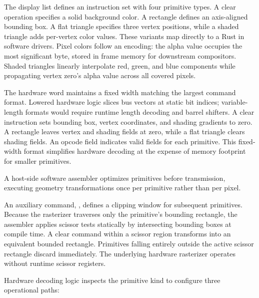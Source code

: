 \documentclass[journal,9pt]{IEEEtran}
\newcommand{\gpupart}[4]{%
}
\begin{document}
The display list defines an instruction set with four primitive types. A
clear operation specifies a solid background color. A rectangle defines an
axis-aligned bounding box. A flat triangle specifies three vertex positions,
while a shaded triangle adds per-vertex color values. These variants map
directly to a Rust  in software drivers. Pixel colors follow an
 encoding: the alpha value occupies the most significant
byte, stored in frame memory for downstream compositors. Shaded triangles
linearly interpolate red, green, and blue components while propagating vertex
zero's alpha value across all covered pixels.

\gpupart{op.rs}{op}{The instruction set: \code{Op} as written by software,
\code{Kind} as decoded by hardware, and \code{Insn} as transmitted across
the bus.}{lst:g-op}

The hardware word  maintains a fixed width matching the largest
command format. Lowered hardware logic slices bus vectors at static bit
indices; variable-length formats would require runtime length decoding and
barrel shifters. A clear instruction sets bounding box, vertex coordinates,
and shading gradients to zero. A rectangle leaves vertex and shading fields
at zero, while a flat triangle clears shading fields. An opcode field
indicates valid fields for each primitive. This fixed-width format simplifies
hardware decoding at the expense of memory footprint for smaller primitives.

A host-side software assembler optimizes primitives before transmission,
executing geometry transformations once per primitive rather than per pixel.

\gpupart{op.rs}{encode}{\code{Op::encode}: software primitive assembler.
It clips bounding boxes, winds vertices, and prunes degenerate
entries.}{lst:g-encode}

An auxiliary command, , defines a clipping window for
subsequent primitives. Because the rasterizer traverses only the primitive's
bounding rectangle, the assembler applies scissor tests statically by
intersecting bounding boxes at compile time. A clear command within a
scissor region transforms into an equivalent bounded rectangle. Primitives
falling entirely outside the active scissor rectangle discard immediately.
The underlying hardware rasterizer operates without runtime scissor
registers.

Hardware decoding logic inspects the primitive kind to configure three
operational paths:
\end{document}
